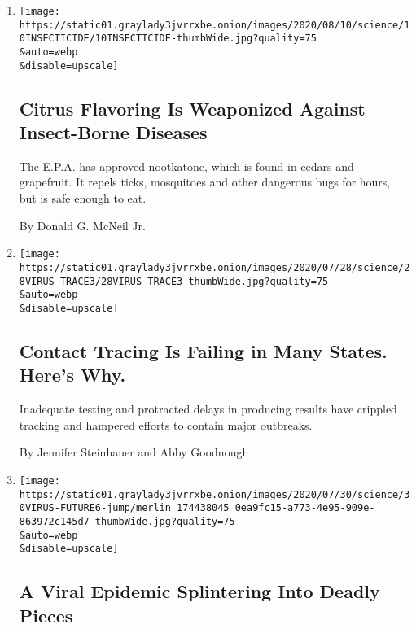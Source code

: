 \begin{enumerate}
\def\labelenumi{\arabic{enumi}.}
\item
  \href{/2020/08/10/health/tick-mosquito-repellant-nootkatone.html}{}

  \texttt{[image: https://static01.graylady3jvrrxbe.onion/images/2020/08/10/science/10INSECTICIDE/10INSECTICIDE-thumbWide.jpg?quality=75\\\&auto=webp\\\&disable=upscale]}

  \hypertarget{citrus-flavoring-is-weaponized-against-insect-borne-diseases}{%
  \subsection{Citrus Flavoring Is Weaponized Against Insect-Borne
  Diseases}\label{citrus-flavoring-is-weaponized-against-insect-borne-diseases}}

  The E.P.A. has approved nootkatone, which is found in cedars and
  grapefruit. It repels ticks, mosquitoes and other dangerous bugs for
  hours, but is safe enough to eat.

  By Donald G. McNeil Jr.
\item
  \href{/2020/07/31/health/covid-contact-tracing-tests.html}{}

  \texttt{[image: https://static01.graylady3jvrrxbe.onion/images/2020/07/28/science/28VIRUS-TRACE3/28VIRUS-TRACE3-thumbWide.jpg?quality=75\\\&auto=webp\\\&disable=upscale]}

  \hypertarget{contact-tracing-is-failing-in-many-states-heres-why}{%
  \subsection{Contact Tracing Is Failing in Many States. Here's
  Why.}\label{contact-tracing-is-failing-in-many-states-heres-why}}

  Inadequate testing and protracted delays in producing results have
  crippled tracking and hampered efforts to contain major outbreaks.

  By Jennifer Steinhauer and Abby Goodnough
\item
  \href{/2020/07/29/health/coronavirus-future-america.html}{}

  \texttt{[image: https://static01.graylady3jvrrxbe.onion/images/2020/07/30/science/30VIRUS-FUTURE6-jump/merlin\_174438045\_0ea9fc15-a773-4e95-909e-863972c145d7-thumbWide.jpg?quality=75\\\&auto=webp\\\&disable=upscale]}

  \hypertarget{a-viral-epidemic-splintering-into-deadly-pieces}{%
  \subsection{A Viral Epidemic Splintering Into Deadly
  Pieces}\label{a-viral-epidemic-splintering-into-deadly-pieces}}


\end{enumerate}
